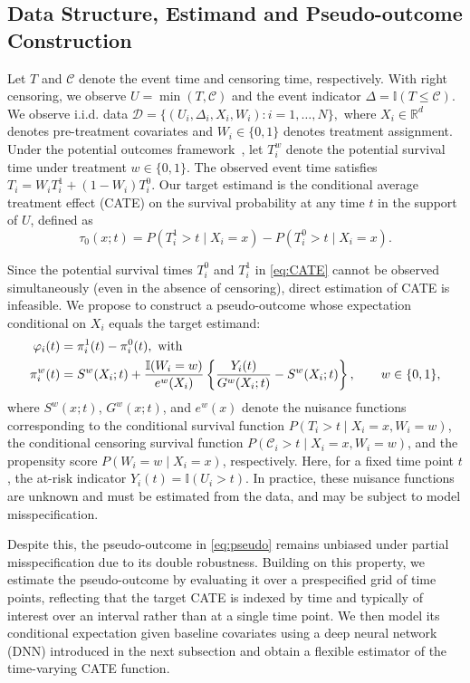 \documentclass{article}
\begin{document}
\subsection{Data Structure,  Estimand and Pseudo-outcome Construction}
\label{notation}
 Let $T$ and $\mathcal C$ denote the event time and censoring time, respectively. With right censoring, we observe $U=\min(T,\mathcal C)$ and the event indicator $\Delta=\mathbb{I}(T\le \mathcal C)$. 
We observe i.i.d. data
\(
\mathcal D=\{(U_i,\Delta_i,X_i,W_i): i=1,\dots,N\},
\)
where $X_i\in\mathbb{R}^d$ denotes pre-treatment covariates and $W_i\in\{0,1\}$ denotes treatment assignment.   Under the potential outcomes framework~\cite{imbens2016causal}, let $T_i^w$ denote the potential survival time under treatment $w\in\{0,1\}$. The observed event time satisfies
\(
T_i = W_i T_i^1 + (1-W_i) T_i^0.
\)
Our target estimand is the conditional average treatment effect (CATE) on the survival probability at  any time $t$ in the support of $U$, defined as
\begin{equation}\label{eq:CATE}
\tau_0(x;t)
=
P(T_i^1>t \mid X_i=x) - P(T_i^0>t \mid X_i=x).
\end{equation}
 
 Since the potential survival times $T_i^0$ and $T_i^1$ in \eqref{eq:CATE} cannot be observed simultaneously (even in the absence of censoring), direct estimation of  CATE  is infeasible. We propose to construct a pseudo-outcome whose  expectation conditional  on $X_i$ equals the target estimand:
\begin{equation}\label{eq:pseudo}
\begin{aligned}
\varphi_i(t) &= \pi_i^1(t)-\pi_i^0(t),  \,\,  {\rm with} \\
\pi_i^w(t)
&=
S^w(X_i;t)
+
\frac{\mathbb I(W_i=w)}{e^w(X_i)}
\left\{
\frac{Y_i(t)}{G^w(X_i;t)}
-
S^w(X_i;t)
\right\},
\qquad w\in\{0,1\},
\end{aligned}
\end{equation}
where $S^w(x;t)$, $G^w(x;t)$, and $e^w(x)$ denote the nuisance functions corresponding to the conditional survival function $P(T_i>t\mid X_i=x,W_i=w)$, the conditional censoring survival function $P(\mathcal C_i>t\mid X_i=x,W_i=w)$, and the propensity score $P(W_i=w\mid X_i=x)$, respectively.  Here, for a fixed time point $t$,  the at-risk indicator
\(
Y_i(t)=\mathbb{I}(U_i>t).
\)
In practice, these nuisance functions are unknown and must be estimated from the data, and may be subject to model misspecification.

Despite this, the pseudo-outcome in \eqref{eq:pseudo} remains unbiased  under partial misspecification due to its double robustness. Building on this property, we estimate the pseudo-outcome by evaluating it over a prespecified grid of time points, reflecting that the target CATE is indexed by time and typically of interest over an interval rather than at a single time point. We then model its conditional expectation given baseline covariates using a deep neural network (DNN) introduced in the next subsection and obtain a flexible estimator of the time-varying CATE function.
\end{document}
